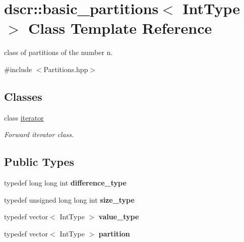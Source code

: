 \hypertarget{classdscr_1_1basic__partitions}{\section{dscr\-:\-:basic\-\_\-partitions$<$ Int\-Type $>$ Class Template Reference}
\label{classdscr_1_1basic__partitions}
}


class of partitions of the number n.  




{\ttfamily \#include $<$Partitions.\-hpp$>$}

\subsection*{Classes}
\begin{DoxyCompactItemize}
\item 
class \hyperlink{classdscr_1_1basic__partitions_1_1iterator}{iterator}
\begin{DoxyCompactList}\small\item\em Forward iterator class. \end{DoxyCompactList}\end{DoxyCompactItemize}
\subsection*{Public Types}
\begin{DoxyCompactItemize}
\item 
\hypertarget{classdscr_1_1basic__partitions_ac5a16891433faee1cc5bf8317f42e7a1}{typedef long long int {\bfseries difference\-\_\-type}}\label{classdscr_1_1basic__partitions_ac5a16891433faee1cc5bf8317f42e7a1}

\item 
\hypertarget{classdscr_1_1basic__partitions_abf69209952351a1d1049fd4080a64fc8}{typedef unsigned long long int {\bfseries size\-\_\-type}}\label{classdscr_1_1basic__partitions_abf69209952351a1d1049fd4080a64fc8}

\item 
\hypertarget{classdscr_1_1basic__partitions_a755211f06e8a96287a7ceb7237075745}{typedef vector$<$ Int\-Type $>$ {\bfseries value\-\_\-type}}\label{classdscr_1_1basic__partitions_a755211f06e8a96287a7ceb7237075745}

\item 
\hypertarget{classdscr_1_1basic__partitions_af204e246963c3cb010238a89db766ed2}{typedef vector$<$ Int\-Type $>$ {\bfseries partition}}\label{classdscr_1_1basic__partitions_af204e246963c3cb010238a89db766ed2}

\end{DoxyCompactItemize}
